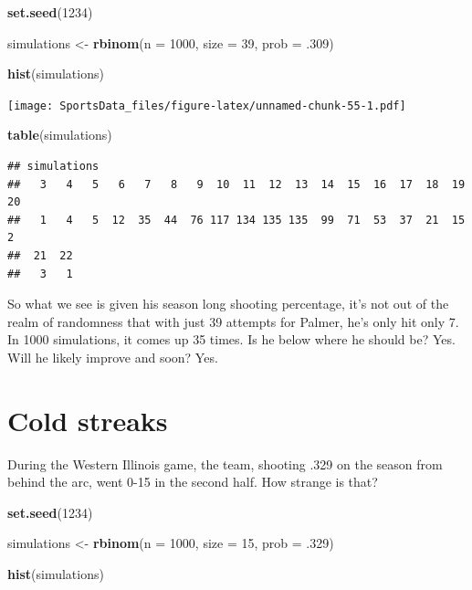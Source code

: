 \documentclass[]{book}
\newenvironment{Shaded}{\begin{snugshade}}{\end{snugshade}}
\newcommand{\KeywordTok}[1]{\textcolor[rgb]{0.13,0.29,0.53}{\textbf{#1}}}
\newcommand{\DataTypeTok}[1]{\textcolor[rgb]{0.13,0.29,0.53}{#1}}
\newcommand{\DecValTok}[1]{\textcolor[rgb]{0.00,0.00,0.81}{#1}}
\newcommand{\StringTok}[1]{\textcolor[rgb]{0.31,0.60,0.02}{#1}}
\newcommand{\NormalTok}[1]{#1}
\begin{document}
\begin{Shaded}
\begin{Highlighting}[]
\KeywordTok{set.seed}\NormalTok{(}\DecValTok{1234}\NormalTok{)}

\NormalTok{simulations <-}\StringTok{ }\KeywordTok{rbinom}\NormalTok{(}\DataTypeTok{n =} \DecValTok{1000}\NormalTok{, }\DataTypeTok{size =} \DecValTok{39}\NormalTok{, }\DataTypeTok{prob =}\NormalTok{ .}\DecValTok{309}\NormalTok{)}

\KeywordTok{hist}\NormalTok{(simulations)}
\end{Highlighting}
\end{Shaded}

\texttt{[image: SportsData\_files/figure-latex/unnamed-chunk-55-1.pdf]}

\begin{Shaded}
\begin{Highlighting}[]
\KeywordTok{table}\NormalTok{(simulations)}
\end{Highlighting}
\end{Shaded}

\begin{verbatim}
## simulations
##   3   4   5   6   7   8   9  10  11  12  13  14  15  16  17  18  19  20 
##   1   4   5  12  35  44  76 117 134 135 135  99  71  53  37  21  15   2 
##  21  22 
##   3   1
\end{verbatim}

So what we see is given his season long shooting percentage, it's not
out of the realm of randomness that with just 39 attempts for Palmer,
he's only hit only 7. In 1000 simulations, it comes up 35 times. Is he
below where he should be? Yes. Will he likely improve and soon? Yes.

\section{Cold streaks}\label{cold-streaks}

During the Western Illinois game, the team, shooting .329 on the season
from behind the arc, went 0-15 in the second half. How strange is that?

\begin{Shaded}
\begin{Highlighting}[]
\KeywordTok{set.seed}\NormalTok{(}\DecValTok{1234}\NormalTok{)}

\NormalTok{simulations <-}\StringTok{ }\KeywordTok{rbinom}\NormalTok{(}\DataTypeTok{n =} \DecValTok{1000}\NormalTok{, }\DataTypeTok{size =} \DecValTok{15}\NormalTok{, }\DataTypeTok{prob =}\NormalTok{ .}\DecValTok{329}\NormalTok{)}

\KeywordTok{hist}\NormalTok{(simulations)}
\end{Highlighting}
\end{Shaded}
\end{document}
